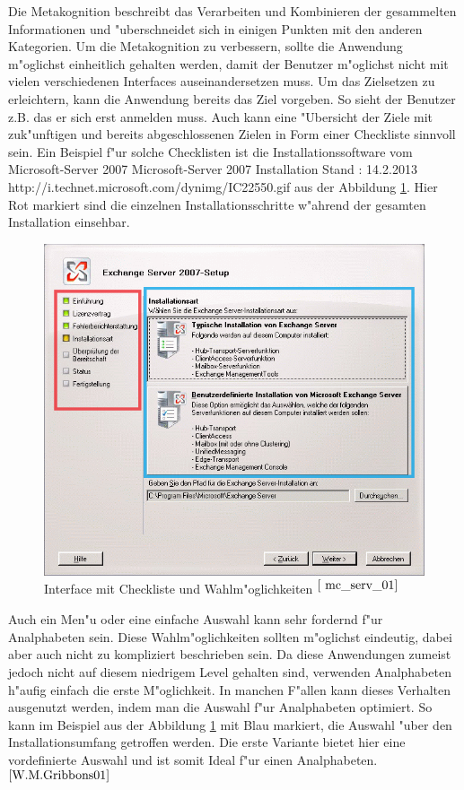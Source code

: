 Die Metakognition beschreibt das Verarbeiten und Kombinieren der gesammelten Informationen und "uberschneidet sich in einigen Punkten mit den anderen Kategorien. Um die Metakognition zu verbessern, sollte die Anwendung m"oglichst einheitlich gehalten werden, damit der Benutzer m"oglichst nicht mit vielen verschiedenen Interfaces auseinandersetzen muss. Um das Zielsetzen zu erleichtern, kann die Anwendung bereits das Ziel vorgeben. So sieht der Benutzer z.B. das er sich erst anmelden muss. Auch kann eine "Ubersicht der Ziele mit zuk"unftigen und bereits abgeschlossenen Zielen in Form einer Checkliste sinnvoll sein. Ein Beispiel f"ur solche Checklisten ist die Installationssoftware vom Microsoft-Server 2007
						{Microsoft-Server 2007 Installation}
						{Stand : 14.2.2013}
						{http://i.technet.microsoft.com/dynimg/IC22550.gif} 
aus der Abbildung \ref{fig:InstallBsp}. Hier Rot markiert sind die einzelnen Installationsschritte w"ahrend der gesamten Installation einsehbar.\\
\begin{figure}[h]
	\centering
		\includegraphics[width=1.00\textwidth]{Daten/ServerBeispiel.png}
	\caption{Interface mit Checkliste und Wahlm"oglichkeiten $^{\ref{ mc_serv_01}}$}
	\label{fig:InstallBsp}
\end{figure}
Auch ein Men"u oder eine einfache Auswahl kann sehr fordernd f"ur Analphabeten sein. Diese Wahlm"oglichkeiten sollten m"oglichst eindeutig, dabei aber auch nicht zu kompliziert beschrieben sein. Da diese Anwendungen zumeist jedoch nicht auf diesem niedrigem Level gehalten sind, verwenden Analphabeten h"aufig
einfach die erste M"oglichkeit. In manchen F"allen kann dieses Verhalten ausgenutzt werden, indem man die Auswahl f"ur Analphabeten optimiert. So kann im Beispiel aus der Abbildung \ref{fig:InstallBsp} mit Blau markiert, die Auswahl "uber den Installationsumfang getroffen werden. Die erste Variante bietet hier eine vordefinierte Auswahl und ist somit Ideal f"ur einen Analphabeten.$^{\ref{W.M.Gribbons01}}$\\


